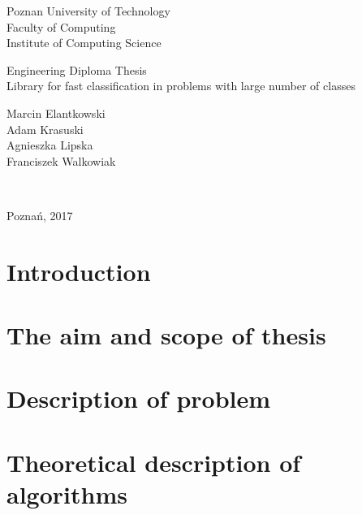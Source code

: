 \documentclass[12pt]{article}
\begin{document}
\thispagestyle{empty}
\begin{center}
	\begin{Large}
	Poznan University of Technology\\
	Faculty of Computing\\
	Institute of Computing Science\\
	\end{Large}
	\vspace*{\fill}
		\begin{Large}
			Engineering Diploma Thesis\\
			\vspace{2ex}
			Library for fast classification in problems with large number of classes\\
			\vspace{2ex}
		\end{Large}
		\begin{large}
			\vspace{2ex}
			Marcin Elantkowski\\
			Adam Krasuski\\
			Agnieszka Lipska\\
			Franciszek Walkowiak\\
		\end{large}
	\vspace*{\fill}
\end{center}
\begin{large}
	\\
\end{large}
\begin{center}
	\vspace{5ex}
	Poznań, 2017
\end{center}
\newpage
\tableofcontents
\section{Introduction}
	
\section{The aim and scope of thesis}
	
\section{Description of problem}
	
\section{Theoretical description of algorithms}
\end{document}
